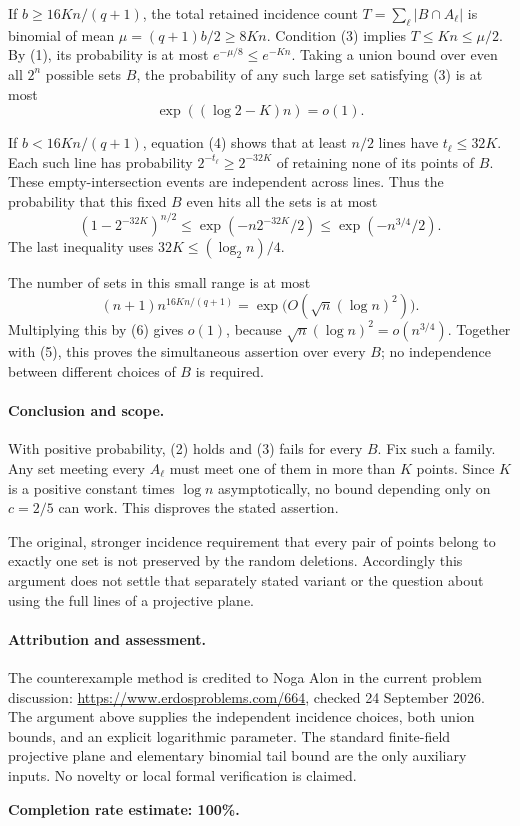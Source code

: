If \(b\geq16Kn/(q+1)\), the total retained incidence count
\(T=\sum_\ell|B\cap A_\ell|\) is binomial of mean \(\mu=(q+1)b/2\geq8Kn\). Condition (3) implies \(T\leq Kn\leq\mu/2\). By (1), its probability is at most \(e^{-\mu/8}\leq e^{-Kn}\). Taking a union bound over even all \(2^n\) possible sets \(B\), the probability of any such large set satisfying (3) is at most
\[
 \exp((\log2-K)n)=o(1). \tag{5}
\]

If \(b<16Kn/(q+1)\), equation (4) shows that at least \(n/2\) lines have \(t_\ell\leq32K\). Each such line has probability \(2^{-t_\ell}\geq2^{-32K}\) of retaining none of its points of \(B\). These empty-intersection events are independent across lines. Thus the probability that this fixed \(B\) even hits all the sets is at most
\[
 (1-2^{-32K})^{n/2}
 \leq\exp(-n2^{-32K}/2)
 \leq\exp(-n^{3/4}/2). \tag{6}
\]
The last inequality uses \(32K\leq(\log_2 n)/4\).

The number of sets in this small range is at most
\[
 (n+1)n^{16Kn/(q+1)}
 =\exp\bigl(O(\sqrt n(\log n)^2)\bigr).
\]
Multiplying this by (6) gives \(o(1)\), because \(\sqrt n(\log n)^2=o(n^{3/4})\). Together with (5), this proves the simultaneous assertion over every \(B\); no independence between different choices of \(B\) is required.

\paragraph{Conclusion and scope.}
With positive probability, (2) holds and (3) fails for every \(B\). Fix such a family. Any set meeting every \(A_\ell\) must meet one of them in more than \(K\) points. Since \(K\) is a positive constant times \(\log n\) asymptotically, no bound depending only on \(c=2/5\) can work. This disproves the stated assertion.

The original, stronger incidence requirement that every pair of points belong to exactly one set is not preserved by the random deletions. Accordingly this argument does not settle that separately stated variant or the question about using the full lines of a projective plane.

\paragraph{Attribution and assessment.}
The counterexample method is credited to Noga Alon in the current problem discussion: \url{https://www.erdosproblems.com/664}, checked 24 September 2026. The argument above supplies the independent incidence choices, both union bounds, and an explicit logarithmic parameter. The standard finite-field projective plane and elementary binomial tail bound are the only auxiliary inputs. No novelty or local formal verification is claimed.

\textbf{Completion rate estimate: 100\%.}
